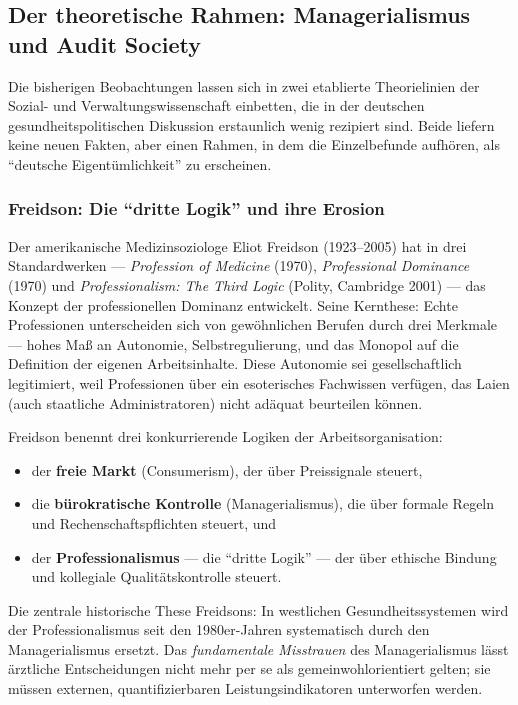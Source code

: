 \documentclass{umbruch-position}
\begin{document}
\subsection{Der theoretische Rahmen: Managerialismus und Audit Society}

Die bisherigen Beobachtungen lassen sich in zwei etablierte Theorielinien der Sozial- und Verwaltungswissenschaft einbetten, die in der deutschen gesundheitspolitischen Diskussion erstaunlich wenig rezipiert sind. Beide liefern keine neuen Fakten, aber einen Rahmen, in dem die Einzelbefunde aufhören, als ``deutsche Eigentümlichkeit'' zu erscheinen.

\subsubsection{Freidson: Die ``dritte Logik'' und ihre Erosion}

Der amerikanische Medizinsoziologe Eliot Freidson (1923--2005) hat in drei Standardwerken --- \textit{Profession of Medicine} (1970), \textit{Professional Dominance} (1970) und \textit{Professionalism: The Third Logic} (Polity, Cambridge 2001) --- das Konzept der professionellen Dominanz entwickelt. Seine Kernthese: Echte Professionen unterscheiden sich von gewöhnlichen Berufen durch drei Merkmale --- hohes Maß an Autonomie, Selbstregulierung, und das Monopol auf die Definition der eigenen Arbeitsinhalte. Diese Autonomie sei gesellschaftlich legitimiert, weil Professionen über ein esoterisches Fachwissen verfügen, das Laien (auch staatliche Administratoren) nicht adäquat beurteilen können.

Freidson benennt drei konkurrierende Logiken der Arbeitsorganisation:

\begin{itemize}[nosep]
  \item der \textbf{freie Markt} (Consumerism), der über Preissignale steuert,
  \item die \textbf{bürokratische Kontrolle} (Managerialismus), die über formale Regeln und Rechenschaftspflichten steuert, und
  \item der \textbf{Professionalismus} --- die ``dritte Logik'' --- der über ethische Bindung und kollegiale Qualitätskontrolle steuert.
\end{itemize}

Die zentrale historische These Freidsons: In westlichen Gesundheitssystemen wird der Professionalismus seit den 1980er-Jahren systematisch durch den Managerialismus ersetzt. Das \textit{fundamentale Misstrauen} des Managerialismus lässt ärztliche Entscheidungen nicht mehr per se als gemeinwohlorientiert gelten; sie müssen externen, quantifizierbaren Leistungsindikatoren unterworfen werden.
\end{document}
